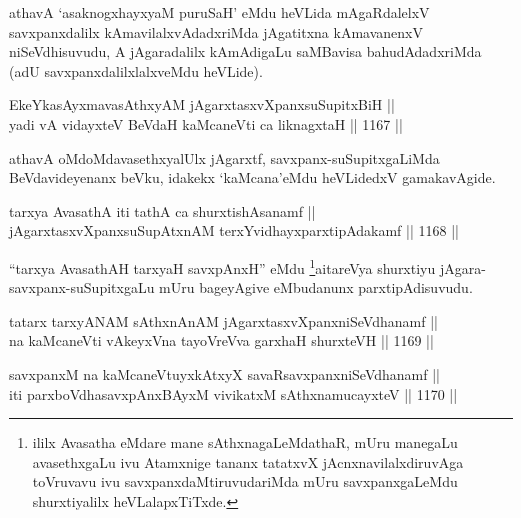 \begin{artha}
athavA `asaknogxhayxyaM puruSaH' eMdu heVLida mAgaRdalelxV savxpanxdalilx kAmavilalxvAdadxriMda jAgatitxna kAmavanenxV niSeVdhisuvudu, A jAgaradalilx kAmAdigaLu saMBavisa bahudAdadxriMda (adU savxpanxdalilxlalxveMdu heVLide).
\end{artha}


\begin{shl}
EkeYkasAyxmavasAthxyAM jAgarxtasxvXpanxsuSupitxBiH || \\
yadi vA vidayxteV BeVdaH kaMcaneVti ca liknagxtaH \hfill || 1167 ||  
\end{shl}

\begin{artha}
athavA oMdoMdavasethxyalUlx jAgarxtf, savxpanx-suSupitxgaLiMda BeVdavideyenanx beVku, idakekx `kaMcana'eMdu heVLidedxV gamakavAgide.
\end{artha}


\begin{shl}
tarxya AvasathA iti tathA ca shurxtishAsanamf || \\
jAgarxtasxvXpanxsuSupAtxnAM terxYvidhayxparxtipAdakamf \hfill || 1168 || 
\end{shl}

\begin{artha}
``tarxya AvasathAH tarxyaH savxpAnxH'' eMdu \footnote{ililx Avasatha eMdare mane sAthxnagaLeMdathaR, mUru manegaLu avasethxgaLu ivu Atamxnige tananx tatatxvX jAcnxnavilalxdiruvAga toVruvavu ivu savxpanxdaMtiruvudariMda mUru savxpanxgaLeMdu shurxtiyalilx heVLalapxTiTxde.}aitareVya shurxtiyu jAgara-savxpanx-suSupitxgaLu mUru bageyAgive eMbudanunx parxtipAdisuvudu.
\end{artha}


\begin{shl}
tatarx tarxyANAM sAthxnAnAM jAgarxtasxvXpanxniSeVdhanamf || \\
na kaMcaneVti vAkeyxVna tayoVreVva garxhaH shurxteVH \hfill || 1169 ||  
\end{shl}
				
\begin{shl}
savxpanxM na kaMcaneVtuyxkAtxyX savaRsavxpanxniSeVdhanamf || \\
iti parxboVdhasavxpAnxBAyxM vivikatxM sAthxnamucayxteV \hfill || 1170 ||  
\end{shl}

